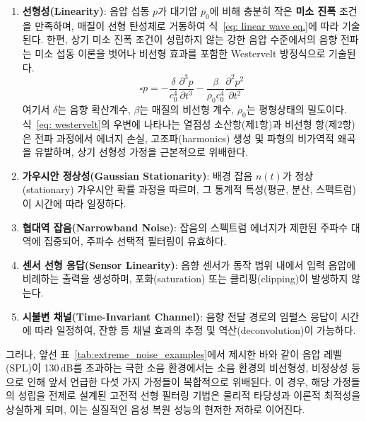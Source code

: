 \documentclass{article}
\begin{document}
\begin{enumerate}
    \item \textbf{선형성(Linearity)}: 음압 섭동 $p$가 대기압 $p_0$에 비해 충분히 작은 \textbf{미소 진폭} 조건을 만족하며, 매질이 선형 탄성체로 거동하여 식~\eqref{eq: linear wave eq.}에 따라 기술된다.
    한편, 상기 미소 진폭 조건이 성립하지 않는 강한 음압 수준에서의 음향 전파는 미소 섭동 이론을 벗어나 비선형 효과를 포함한 Westervelt 방정식으로 기술된다.
    \begin{equation}\label{eq: westervelt}
        \square p = -\frac{\delta}{c_0^4}\frac{\partial^3 p}{\partial t^3} - \frac{\beta}{\rho_0 c_0^4}\frac{\partial^2 p^2}{\partial t^2}
    \end{equation}
    여기서 $\delta$는 음향 확산계수, $\beta$는 매질의 비선형 계수, $\rho_{0}$는 평형상태의 밀도이다. 
    식~\eqref{eq: westervelt}의 우변에 나타나는 열점성 소산항(제1항)과 비선형 항(제2항)은 전파 과정에서 에너지 손실, 고조파(harmonics) 생성 및 파형의 비가역적 왜곡을 유발하며, 상기 선형성 가정을 근본적으로 위배한다.
    
    \item \textbf{가우시안 정상성(Gaussian Stationarity)}: 배경 잡음 $n(t)$가 정상(stationary) 가우시안 확률 과정을 따르며, 그 통계적 특성(평균, 분산, 스펙트럼)이 시간에 따라 일정하다.
    
    \item \textbf{협대역 잡음(Narrowband Noise)}: 잡음의 스펙트럼 에너지가 제한된 주파수 대역에 집중되어, 주파수 선택적 필터링이 유효하다.
    
    \item \textbf{센서 선형 응답(Sensor Linearity)}: 음향 센서가 
    동작 범위 내에서 입력 음압에 비례하는 출력을 생성하며, 
    포화(saturation) 또는 클리핑(clipping)이 발생하지 않는다.
    \item \textbf{시불변 채널(Time-Invariant Channel)}: 음향 전달 경로의 
    임펄스 응답이 시간에 따라 일정하여, 잔향 등 채널 효과의 추정 및 
    역산(deconvolution)이 가능하다.
\end{enumerate}
그러나, 앞선 표~\ref{tab:extreme_noise_examples}에서 제시한 바와 같이 음압 레벨(SPL)이 130\,dB를 초과하는 극한 소음 환경에서는 소음 환경의 비선형성, 비정상성 등으로 인해 앞서 언급한 다섯 가지 가정들이 복합적으로 위배된다.
이 경우, 해당 가정들의 성립을 전제로 설계된 고전적 선형 필터링 기법은 물리적 타당성과 이론적 최적성을 상실하게 되며, 이는 실질적인 음성 복원 성능의 현저한 저하로 이어진다.
\end{document}
